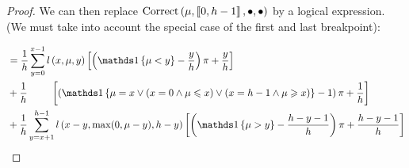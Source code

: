 \begin{proof}
We can then replace $\text{Correct}\left(\mu, \left\llbracket0, h - 1\right\rrbracket, \bullet, \bullet\right)$ by a logical expression. (We must take into account the special case of the first and last breakpoint):

\begin{align}
    \begin{aligned}
        &=\frac{1}{h} \sum_{y = 0}^{x - 1} \bosl{x}{\mu}{y} \left[ \left( \indickronecker{\mu < y} - \frac{y}{h} \right) \pi + \frac{y}{h} \right] \\
        &+\frac{1}{h} \ \qquad \left[ \left( \indickronecker{\mu = x \lor (x = 0 \land \mu \leq x) \lor (x = h - 1 \land \mu \geq x)} - 1 \right) \pi +  \frac{1}{h} \right] \\
        &+\frac{1}{h} \sum_{y = x + 1}^{h - 1}\bosl{x - y}{\max(0, \mu - y)}{h - y}    \left[ \left( \indickronecker{\mu > y} - \frac{h - y - 1}{h} \right) \pi + \frac{h - y - 1}{h} \right]
    \end{aligned} \\
\end{align}
\end{proof}


